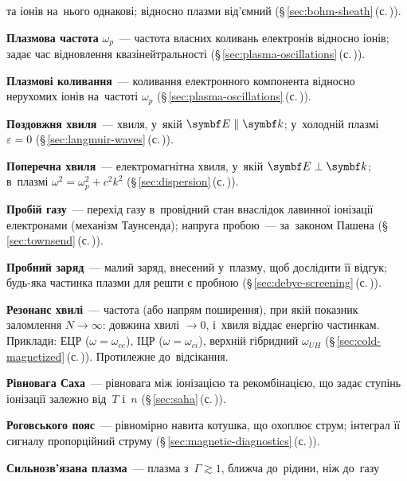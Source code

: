 	  та іонів на~нього однакові; відносно плазми від'ємний (§\,\ref{sec:bohm-sheath}\,(с.\,\pageref{sec:bohm-sheath})).
	\item \textbf{Плазмова частота} $\omega_p$~--- частота власних коливань електронів відносно іонів;
	  задає час відновлення квазінейтральності (§\,\ref{sec:plasma-oscillations}\,(с.\,\pageref{sec:plasma-oscillations})).
	\item \textbf{Плазмові коливання}~--- коливання електронного компонента відносно нерухомих іонів на~частоті
	  $\omega_p$ (§\,\ref{sec:plasma-oscillations}\,(с.\,\pageref{sec:plasma-oscillations})).
	\item \textbf{Поздовжня хвиля}~--- хвиля, у~якій $\vect E\parallel\vect k$; у~холодній плазмі $\varepsilon=0$
	  (§\,\ref{sec:langmuir-waves}\,(с.\,\pageref{sec:langmuir-waves})).
	\item \textbf{Поперечна хвиля}~--- електромагнітна хвиля, у~якій $\vect E\perp\vect k$; в~плазмі
	  $\omega^2=\omega_p^2+c^2k^2$ (§\,\ref{sec:dispersion}\,(с.\,\pageref{sec:dispersion})).
	\item \textbf{Пробій газу}~--- перехід газу в~провідний стан внаслідок лавинної іонізації електронами (механізм Таунсенда); напруга пробою~--- за~законом Пашена (§\,\ref{sec:townsend}\,(с.\,\pageref{sec:townsend})).
	\item \textbf{Пробний заряд}~--- малий заряд, внесений у~плазму, щоб дослідити її відгук; будь-яка частинка
	  плазми для решти є пробною (§\,\ref{sec:debye-screening}\,(с.\,\pageref{sec:debye-screening})).
	\item \textbf{Резонанс хвилі}~--- частота (або напрям поширення), при якій показник заломлення $N\to\infty$: довжина хвилі $\to0$,
	  і~хвиля віддає енергію частинкам. Приклади: ЕЦР ($\omega=\omega_{ce}$), ІЦР ($\omega=\omega_{ci}$), верхній гібридний $\omega_{UH}$
	  (§\,\ref{sec:cold-magnetized}\,(с.\,\pageref{sec:cold-magnetized})). Протилежне до~відсікання.
	\item \textbf{Рівновага Саха}~--- рівновага між іонізацією та рекомбінацією, що задає ступінь іонізації
	  залежно від~$T$ і~$n$ (§\,\ref{sec:saha}\,(с.\,\pageref{sec:saha})).
	\item \textbf{Роговського пояс}~--- рівномірно навита котушка, що охоплює струм; інтеграл її сигналу пропорційний струму (§\,\ref{sec:magnetic-diagnostics}\,(с.\,\pageref{sec:magnetic-diagnostics})).
	\item \textbf{Сильнозв'язана плазма}~--- плазма з~$\Gamma\gtrsim1$, ближча до~рідини, ніж до~газу
